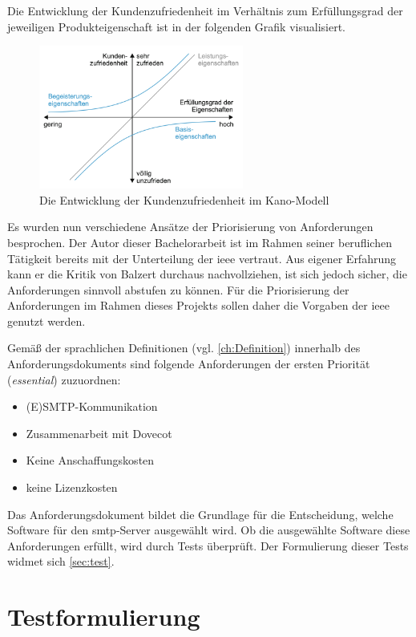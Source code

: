 Die Entwicklung der Kundenzufriedenheit im Verhältnis zum Erfüllungsgrad der jeweiligen Produkteigenschaft ist in der folgenden Grafik visualisiert.

\begin{figure}[H]
  \centering
  \includegraphics[width=0.6\textwidth]{res/kano.png}
  \caption{Die Entwicklung der Kundenzufriedenheit im Kano-Modell \citep[][545]{Balzert2010}}
  \label{fig:Kanomodell}
\end{figure}

Es wurden nun verschiedene Ansätze der Priorisierung von Anforderungen besprochen. Der Autor dieser Bachelorarbeit ist im Rahmen seiner beruflichen Tätigkeit bereits mit der Unterteilung der \ac{ieee} vertraut. Aus eigener Erfahrung kann er die Kritik von Balzert durchaus nachvollziehen, ist sich jedoch sicher, die Anforderungen sinnvoll abstufen zu können. Für die Priorisierung der Anforderungen im Rahmen dieses Projekts sollen daher die Vorgaben der \ac{ieee} genutzt werden.

Gemäß der sprachlichen Definitionen (vgl. \autoref{ch:Definition}) innerhalb des Anforderungsdokuments sind folgende Anforderungen der ersten Priorität (\textit{essential}) zuzuordnen:
\begin{itemize}
	\item (E)SMTP-Kommunikation
	\item Zusammenarbeit mit Dovecot
	\item Keine Anschaffungskosten
	\item keine Lizenzkosten
\end{itemize}

Das Anforderungsdokument bildet die Grundlage für die Entscheidung, welche Software für den \ac{smtp}-Server ausgewählt wird. Ob die ausgewählte Software diese Anforderungen erfüllt, wird durch Tests überprüft. Der Formulierung dieser Tests widmet sich \autoref{sec:test}.

\section{Testformulierung}
\label{sec:test}

